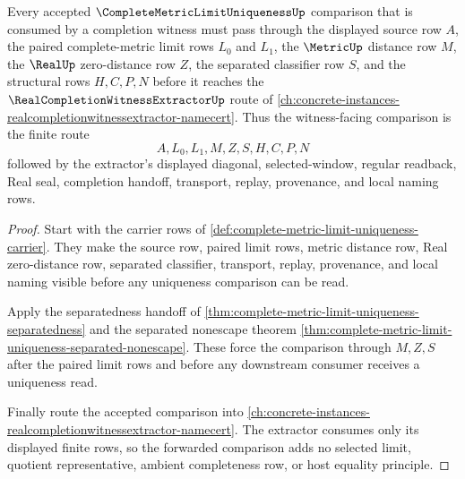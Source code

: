 \begin{theorem}
\label{thm:complete-metric-limit-uniqueness-completion-witness-route}
Every accepted $\CompleteMetricLimitUniquenessUp$ comparison that is consumed by a completion witness must pass through the displayed source row $A$, the paired complete-metric limit rows $L_{0}$ and $L_{1}$, the $\MetricUp$ distance row $M$, the $\RealUp$ zero-distance row $Z$, the separated classifier row $S$, and the structural rows $H,C,P,N$ before it reaches the $\RealCompletionWitnessExtractorUp$ route of \autoref{ch:concrete-instances-realcompletionwitnessextractor-namecert}. Thus the witness-facing comparison is the finite route
$$
A,L_{0},L_{1},M,Z,S,H,C,P,N
$$
followed by the extractor's displayed diagonal, selected-window, regular readback, Real seal, completion handoff, transport, replay, provenance, and local naming rows.
\end{theorem}
\begin{proof}
Start with the carrier rows of \autoref{def:complete-metric-limit-uniqueness-carrier}. They make the source row, paired limit rows, metric distance row, Real zero-distance row, separated classifier, transport, replay, provenance, and local naming visible before any uniqueness comparison can be read.

Apply the separatedness handoff of \autoref{thm:complete-metric-limit-uniqueness-separatedness} and the separated nonescape theorem \autoref{thm:complete-metric-limit-uniqueness-separated-nonescape}. These force the comparison through $M,Z,S$ after the paired limit rows and before any downstream consumer receives a uniqueness read.

Finally route the accepted comparison into \autoref{ch:concrete-instances-realcompletionwitnessextractor-namecert}. The extractor consumes only its displayed finite rows, so the forwarded comparison adds no selected limit, quotient representative, ambient completeness row, or host equality principle.
\end{proof}

